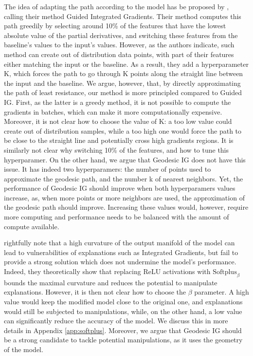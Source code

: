 The idea of adapting the path according to the model has be proposed by \citet{kapishnikov2021guided}, calling their method Guided Integrated Gradients. Their method computes this path greedily by selecting around 10\% of the features that have the lowest absolute value of the partial derivatives, and switching these features from the baseline's values to the input's values. However, as the authors indicate, such method can create out of distribution data points, with part of their features either matching the input or the baseline. As a result, they add a hyperparameter K, which forces the path to go through K points along the straight line between the input and the baseline. 
We argue, however, that, by directly approximating the path of least resistance, our method is more principled compared to Guided IG. First, as the latter is a greedy method, it is not possible to compute the gradients in batches, which can make it more computationally expensive. Moreover, it is not clear how to choose the value of K: a too low value could create out of distribution samples, while a too high one would force the path to be close to the straight line and potentially cross high gradients regions. It is similarly not clear why switching 10\% of the features, and how to tune this hyperparamer. On the other hand, we argue that Geodesic IG does not have this issue. It has indeed two hyperparamers: the number of points used to approximate the geodesic path, and the number k of nearest neighbors. Yet, the performance of Geodesic IG should improve when both hyperparamers values increase, as, when more points or more neighbors are used, the approximation of the geodesic path should improve. Increasing these values would, however, require more computing and performance needs to be balanced with the amount of compute available.

\citet{dombrowski2019explanations} rightfully note that a high curvature of the output manifold of the model can lead to vulnerabilities of explanations such as Integrated Gradients, but fail to provide a strong solution which does not undermine the model's performance. Indeed, they theoretically show that replacing ReLU activations with $\textrm{Softplus}_{\beta}$ bounds the maximal curvature and reduces the potential to manipulate explanations. However, it is then not clear how to choose the $\beta$ parameter. A high value would keep the modified model close to the original one, and explanations would still be subjected to manipulations, while, on the other hand, a low value can significantly reduce the accuracy of the model. We discuss this in more details in Appendix \ref{app:softplus}. Moreover, we argue that Geodesic IG should be a strong candidate to tackle potential manipulations, as it uses the geometry of the model.
